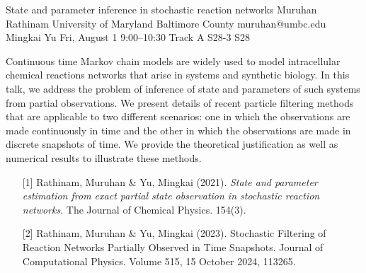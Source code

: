 \begin{talk}
  {State and parameter inference in stochastic reaction networks}%
  {Muruhan Rathinam}%
  {University of Maryland Baltimore County}%
  {muruhan@umbc.edu}%
  {Mingkai Yu}%
  {}%
  {Fri, August 1 9:00–10:30 Track A}%
  {S28-3}%
  {S28}%
  
				
Continuous time Markov chain models are widely used to model intracellular chemical reactions networks that arise in systems and synthetic biology. In this talk, we address the problem of inference of state and parameters of such systems from partial observations. We present details of recent particle filtering methods that are applicable to two different scenarios: one in which the observations are made continuously in time and the other in which the observations are made in discrete snapshots of time.            We provide the theoretical justification as well as numerical results to illustrate these methods.       
			
\medskip

\begin{enumerate}
	\item[{[1]}] Rathinam, Muruhan \& Yu, Mingkai (2021). {\it State and parameter estimation from exact partial state observation in stochastic reaction networks}. The Journal of Chemical Physics. 
 154(3).
	\item[{[2]}] Rathinam, Muruhan \& Yu, Mingkai (2023). Stochastic Filtering of Reaction Networks Partially Observed in Time Snapshots. Journal of Computational Physics. 
Volume 515, 15 October 2024, 113265. 

\end{enumerate}

\end{talk}

